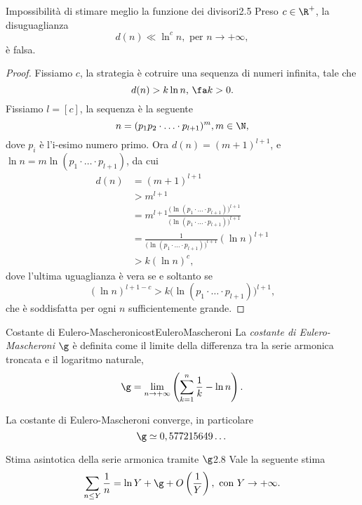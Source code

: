 \begin{teor}{Impossibilità di stimare meglio la funzione dei divisori}{2.5}
	Preso \(c\in\R^+\), la disuguaglianza
	\[
		d(n)\ll \ln^c n,\text{ per }n\to+\infty,
	\]
	è falsa.
\end{teor}

\begin{proof}
	Fissiamo \(c\), la strategia è cotruire una sequenza di numeri infinita, tale che
	\[
		d(n)>k\ln n,\,\fa k>0.
	\]
	Fissiamo \(l=[c]\), la sequenza è la seguente
	\[
		n=(p_1 p_2\cdot\ldots\cdot p_{l+1})^m,m\in\N,
	\]
	dove \(p_i\) è l'i-esimo numero primo.
	Ora \(d(n)=(m+1)^{l+1}\), e \(\ln n=m\ln(p_1\cdot\ldots\cdot p_{l+1})\), da cui
	\[
		\begin{split}
			d(n) & =(m+1)^{l+1}\\
			& >m^{l+1}\\
			& =m^{l+1}\frac{\big(\ln(p_1\cdot\ldots\cdot p_{l+1})\big)^{l+1}}{\big(\ln(p_1\cdot\ldots\cdot p_{l+1})\big)^{l+1}}\\
			& =\frac{1}{\big(\ln(p_1\cdot\ldots\cdot p_{l+1})\big)^{l+1}}(\ln n)^{l+1}\\
			& >k (\ln n)^c,
		\end{split}
	\]
	dove l'ultima uguaglianza è vera se e soltanto se
	\[
		(\ln n)^{l+1-c}>k\big(\ln(p_1\cdot\ldots\cdot p_{l+1})\big)^{l+1},
	\]
	che è soddisfatta per ogni \(n\) sufficientemente grande.
\end{proof}

\begin{defn}{Costante di Eulero-Mascheroni}{costEuleroMascheroni}
	La \emph{costante di Eulero-Mascheroni} \(\g\) è definita come il limite della differenza tra la serie armonica troncata e il logaritmo naturale,
	\[
		\g=\lim_{n\to+\infty}\left(\sum_{k=1}^n \frac{1}{k}-\ln n\right).
	\]
\end{defn}

\begin{oss}
	La costante di Eulero-Mascheroni converge, in particolare
	\[
		\g\simeq 0,577215649\dots
	\]
\end{oss}

\begin{teor}{Stima asintotica della serie armonica tramite \(\g\)}{2.8}
	Vale la seguente stima
	\[
		\sum_{n\le Y}\frac{1}{n}=\ln Y+\g+O\left(\frac{1}{Y}\right),\text{ con }Y\to+\infty.
	\]
\end{teor}

